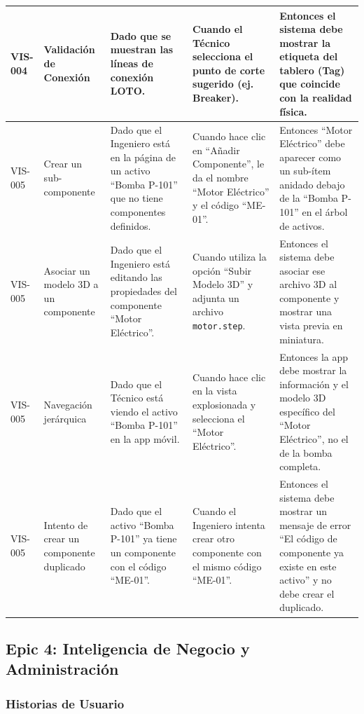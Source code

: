 \documentclass[12pt, a4paper]{article}
\begin{document}
\begin{longtable}{|p{1.8cm}|p{3cm}|p{3.5cm}|p{3.5cm}|p{3.5cm}|}
VIS-004 & Validación de Conexión & Dado que se muestran las líneas de conexión LOTO. & Cuando el Técnico selecciona el punto de corte sugerido (ej. Breaker). & Entonces el sistema debe mostrar la etiqueta del tablero (Tag) que coincide con la realidad física. \\ \hline
VIS-005 & Crear un sub-componente & Dado que el Ingeniero está en la página de un activo ``Bomba P-101'' que no tiene componentes definidos. & Cuando hace clic en ``Añadir Componente'', le da el nombre ``Motor Eléctrico'' y el código ``ME-01''. & Entonces ``Motor Eléctrico'' debe aparecer como un sub-ítem anidado debajo de la ``Bomba P-101'' en el árbol de activos. \\ \hline
VIS-005 & Asociar un modelo 3D a un componente & Dado que el Ingeniero está editando las propiedades del componente ``Motor Eléctrico''. & Cuando utiliza la opción ``Subir Modelo 3D'' y adjunta un archivo \texttt{motor.step}. & Entonces el sistema debe asociar ese archivo 3D al componente y mostrar una vista previa en miniatura. \\ \hline
VIS-005 & Navegación jerárquica & Dado que el Técnico está viendo el activo ``Bomba P-101'' en la app móvil. & Cuando hace clic en la vista explosionada y selecciona el ``Motor Eléctrico''. & Entonces la app debe mostrar la información y el modelo 3D específico del ``Motor Eléctrico'', no el de la bomba completa. \\ \hline
VIS-005 & Intento de crear un componente duplicado & Dado que el activo ``Bomba P-101'' ya tiene un componente con el código ``ME-01''. & Cuando el Ingeniero intenta crear otro componente con el mismo código ``ME-01''. & Entonces el sistema debe mostrar un mensaje de error ``El código de componente ya existe en este activo'' y no debe crear el duplicado. \\ \hline
\end{longtable}

\subsection{Epic 4: Inteligencia de Negocio y Administración}

\subsubsection*{Historias de Usuario}
\end{document}
